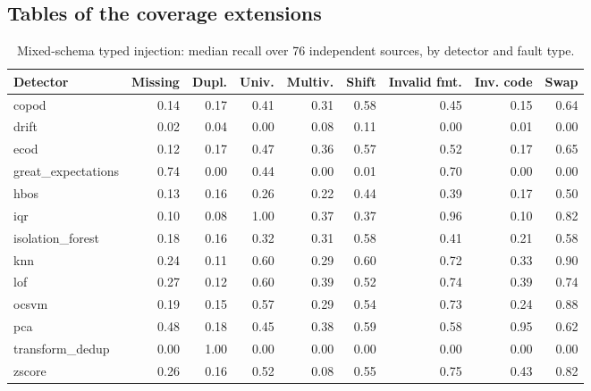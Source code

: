 \documentclass[conference]{IEEEtran}
\begin{document}
\subsection{Tables of the coverage extensions}
\label{app:coverage-tables}
\begin{table}[t]
\caption{Mixed-schema typed injection: median recall over 76 independent sources, by detector and fault type.}
\label{tab:mixed-typed}
\centering
\scriptsize
\setlength{\tabcolsep}{2.5pt}
\begin{tabular}{lrrrrrrrr}
\toprule
Detector & Missing & Dupl. & Univ. & Multiv. & Shift & Invalid fmt. & Inv. code & Swap \\
\midrule
copod & 0.14 & 0.17 & 0.41 & 0.31 & 0.58 & 0.45 & 0.15 & 0.64 \\
drift & 0.02 & 0.04 & 0.00 & 0.08 & 0.11 & 0.00 & 0.01 & 0.00 \\
ecod & 0.12 & 0.17 & 0.47 & 0.36 & 0.57 & 0.52 & 0.17 & 0.65 \\
great\_expectations & 0.74 & 0.00 & 0.44 & 0.00 & 0.01 & 0.70 & 0.00 & 0.00 \\
hbos & 0.13 & 0.16 & 0.26 & 0.22 & 0.44 & 0.39 & 0.17 & 0.50 \\
iqr & 0.10 & 0.08 & 1.00 & 0.37 & 0.37 & 0.96 & 0.10 & 0.82 \\
isolation\_forest & 0.18 & 0.16 & 0.32 & 0.31 & 0.58 & 0.41 & 0.21 & 0.58 \\
knn & 0.24 & 0.11 & 0.60 & 0.29 & 0.60 & 0.72 & 0.33 & 0.90 \\
lof & 0.27 & 0.12 & 0.60 & 0.39 & 0.52 & 0.74 & 0.39 & 0.74 \\
ocsvm & 0.19 & 0.15 & 0.57 & 0.29 & 0.54 & 0.73 & 0.24 & 0.88 \\
pca & 0.48 & 0.18 & 0.45 & 0.38 & 0.59 & 0.58 & 0.95 & 0.62 \\
transform\_dedup & 0.00 & 1.00 & 0.00 & 0.00 & 0.00 & 0.00 & 0.00 & 0.00 \\
zscore & 0.26 & 0.16 & 0.52 & 0.08 & 0.55 & 0.75 & 0.43 & 0.82 \\
\bottomrule
\end{tabular}
\end{table}
\end{document}
